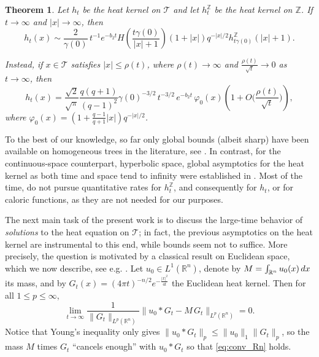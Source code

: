 \documentclass[11pt,a4paper,reqno]{amsart}
\renewcommand\mathcal{\mathscr}
\theoremstyle{plain}
\newtheorem{thmx}{Theorem}
\theoremstyle{remark}
\theoremstyle{definition}
\theoremstyle{remark}
\numberwithin{equation}{section}
\def\int{\intop\nolimits}
\begin{document}
\begin{thmx}\label{thm:thmA}
Let $h_t$ be the heat kernel on $\mathcal{T}$ and let
$h_t^{\mathbb Z}$ be the heat kernel on $\mathbb Z$. If
$t\to\infty$ and $|x|\to\infty$, then
\[
h_t(x)\sim
\frac{2}{\gamma(0)}\,t^{-1}e^{-b_2t}
H\!\left(\frac{t\gamma(0)}{|x|+1}\right)
(1+|x|)q^{-|x|/2}
h_{t\gamma(0)}^{\mathbb Z}(|x|+1).
\]


\noindent Instead, if $x\in \mathcal{T}$ satisfies $|x|\leq \rho(t)$, where $\rho(t)\to \infty$ and  $\frac{\rho(t)}{\sqrt{t}}\to 0$ as $t\to \infty$, then
		\[
		h_t(x)=\frac{\sqrt{2}}{\sqrt{\pi}}\frac{q(q+1)}{(q-1)^2}\gamma(0)^{-3/2}\, t^{-3/2}\,e^{-b_2t}\, \varphi_0(x)\left(1+O\Big(\frac{\rho(t)}{\sqrt{t}}\Big)\right), 
		\]
        where $\varphi_0(x)=\left(1+\frac{q-1}{q+1}|x|\right)q^{-|x|/2}$.
	\end{thmx}

To the best of our knowledge, so far only global bounds (albeit sharp) have been available on homogeneous trees in the literature, see \cite[Proposition 2.5]{CMS}. In contrast, for the continuous-space counterpart, hyperbolic space, global asymptotics for the heat kernel as both time and space tend to infinity were established in \cite{AJ99}. Most of the time, do not pursue quantitative rates for $h_t^{\mathbb Z}$, and consequently for $h_t$, or for caloric functions, as they are not needed for our purposes.


The next main task of the present work is to discuss the large-time behavior of \textit{solutions} to the heat equation on $\mathcal{T}$; in fact, the previous asymptotics on the heat kernel are instrumental to this end, while bounds seem not to suffice. More precisely, the question is motivated by a classical result on Euclidean space, which we now describe, see e.g. \cite{Vaz0}. Let $u_0\in L^1(\mathbb{R}^n)$, denote by $M=\int_{\mathbb{R}^n}u_0(x)\, dx$ its mass, and by $G_t(x) = (4\pi t)^{-n/2}e^{-\frac{|x|^2}{4t}}$ the Euclidean heat kernel. Then for all $1\leq p\leq \infty$,
\begin{equation}\label{eq:conv_Rn}
		\lim_{t \to \infty} 
		\frac{1}{\|G_t\|_{L^p(\mathbb{R}^n)}}
		\| u_0\ast G_t-M\, G_t\|_{L^p(\mathbb{R}^n)}=0.
		\end{equation}
        Notice that Young's inequality only gives $\|u_0\ast G_t\|_{p}\leq \|u_0\|_{1}\|G_t\|_{p}$, so the mass $M$ times $G_t$ ``cancels enough'' with $u_0\ast G_t$ so that \eqref{eq:conv_Rn} holds.
        
\end{document}
